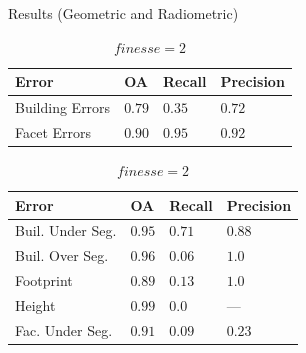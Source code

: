 \documentclass{beamer}
\begin{document}
            \begin{frame}[plain]{Results (Geometric and Radiometric)}
                \begin{table}
                    \begin{subtable}{.4\textwidth}
                        \tiny
                        \begin{center}
                            \begin{tabular}{x{1cm} x{.5cm} x{.5cm} x{.5cm}}
                                \toprule
                                {\bf Error} & {\bf OA} & {\bf Recall} & {\bf Precision} \\
                                \midrule
                                Building Errors & $0.79$ & $0.35$ & $0.72$ \\
                                \midrule
                                Facet Errors & $0.90$ & $0.95$ & $0.92$ \\
                                \bottomrule
                            \end{tabular}
                            \caption{\tiny\label{tab::finesse2} $finesse = 2$}
                        \end{center}
                    \end{subtable}
                    \begin{subtable}{.45\textwidth}
                        \tiny
                        \begin{center}
                            \begin{tabular}{x{1.75cm} x{.5cm} x{.5cm} x{.5cm}}
                                \toprule
                                {\bf Error} & {\bf OA} & {\bf Recall} & {\bf Precision} \\
                                \midrule
                                Buil. Under Seg. & $0.95$ & $0.71$ & $0.88$ \\
                                \midrule
                                Buil. Over Seg. & $0.96$ & $0.06$ & $1.0$ \\
                                \midrule
                                Footprint & $0.89$ & $0.13$ & $1.0$ \\
                                \midrule
                                Height & $0.99$ & $0.0$ & --- \\
                                \midrule
                                \midrule
                                Fac. Under Seg. & $0.91$ & $0.09$ & $0.23$ \\

\end{tabular}
\end{center}
\end{subtable}
\end{table}
\end{frame}
\end{document}
